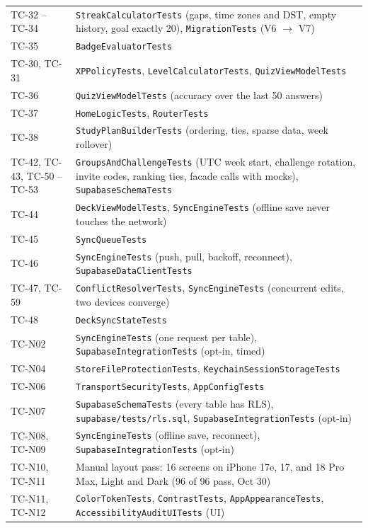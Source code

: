 \documentclass[12pt,letterpaper]{article}
\begin{document}
\begin{xltabular}{\textwidth}{@{}L{2.4cm} Y@{}}
TC-32 -- TC-34 & \texttt{StreakCalculatorTests} (gaps, time zones and DST, empty history, goal exactly 20), \texttt{MigrationTests} (V6 $\to$ V7) \\
TC-35 & \texttt{BadgeEvaluatorTests} \\
TC-30, TC-31 & \texttt{XPPolicyTests}, \texttt{LevelCalculatorTests}, \texttt{QuizViewModelTests} \\
TC-36 & \texttt{QuizViewModelTests} (accuracy over the last 50 answers) \\
TC-37 & \texttt{HomeLogicTests}, \texttt{RouterTests} \\
TC-38 & \texttt{StudyPlanBuilderTests} (ordering, ties, sparse data, week rollover) \\
TC-42, TC-43, TC-50 -- TC-53 & \texttt{GroupsAndChallengeTests} (UTC week start, challenge rotation, invite codes, ranking ties, facade calls with mocks), \texttt{SupabaseSchemaTests} \\
TC-44 & \texttt{DeckViewModelTests}, \texttt{SyncEngineTests} (offline save never touches the network) \\
TC-45 & \texttt{SyncQueueTests} \\
TC-46 & \texttt{SyncEngineTests} (push, pull, backoff, reconnect), \texttt{SupabaseDataClientTests} \\
TC-47, TC-59 & \texttt{ConflictResolverTests}, \texttt{SyncEngineTests} (concurrent edits, two devices converge) \\
TC-48 & \texttt{DeckSyncStateTests} \\
TC-N02 & \texttt{SyncEngineTests} (one request per table), \texttt{SupabaseIntegrationTests} (opt-in, timed) \\
TC-N04 & \texttt{StoreFileProtectionTests}, \texttt{KeychainSessionStorageTests} \\
TC-N06 & \texttt{TransportSecurityTests}, \texttt{AppConfigTests} \\
TC-N07 & \texttt{SupabaseSchemaTests} (every table has RLS), \texttt{supabase/tests/rls.sql}, \texttt{SupabaseIntegrationTests} (opt-in) \\
TC-N08, TC-N09 & \texttt{SyncEngineTests} (offline save, reconnect), \texttt{SupabaseIntegrationTests} (opt-in) \\
TC-N10, TC-N11 & Manual layout pass: 16 screens on iPhone 17e, 17, and 18 Pro Max, Light and Dark (96 of 96 pass, Oct 30) \\
TC-N11, TC-N12 & \texttt{ColorTokenTests}, \texttt{ContrastTests}, \texttt{AppAppearanceTests}, \texttt{AccessibilityAuditUITests} (UI) \\

\end{xltabular}
\end{document}
